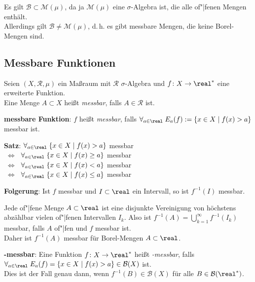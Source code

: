 Es gilt $\mathcal{B} \subset \mathcal{M}(\mu)$, da ja $\mathcal{M}(\mu)$ eine
$\sigma$-Algebra ist, die alle of"|fenen Mengen enthält. \\
Allerdings gilt $\mathcal{B} \not= \mathcal{M}(\mu)$, d.\,h. es gibt
messbare Mengen, die keine Borel-Mengen sind.

\pagebreak

\subsection{%
    Messbare Funktionen%
}

Seien $(X, \mathcal{R}, \mu)$ ein Maßraum mit $\mathcal{R}$ $\sigma$-Algebra
und $f\colon X \rightarrow \real^\ast$ eine erweiterte Funktion. \\
Eine Menge $A \subset X$ heißt \emph{messbar}, falls $A \in \mathcal{R}$ ist.

\textbf{messbare Funktion}:
$f$ heißt \emph{messbar}, falls
$\forall_{a \in \real}\; E_a(f) := \{x \in X \;|\; f(x) > a\}$ messbar ist.

\textbf{Satz}:
$\forall_{a \in \real}\; \{x \in X \;|\; f(x) > a\}$ messbar \\
$\;\Leftrightarrow\;$
$\forall_{a \in \real}\; \{x \in X \;|\; f(x) \ge a\}$ messbar \\
$\;\Leftrightarrow\;$
$\forall_{a \in \real}\; \{x \in X \;|\; f(x) < a\}$ messbar \\
$\;\Leftrightarrow\;$
$\forall_{a \in \real}\; \{x \in X \;|\; f(x) \le a\}$ messbar

\textbf{Folgerung}:
Ist $f$ messbar und $I \subset \real$ ein Intervall,
so ist $f^{-1}(I)$ messbar.

Jede of"|fene Menge $A \subset \real$ ist eine disjunkte Vereinigung von
höchstens abzählbar vielen of"|fenen Intervallen $I_k$.
Also ist $f^{-1}(A) = \bigcup_{k=1}^\infty f^{-1}(I_k)$
messbar, falls $A$ of"|fen und $f$ messbar ist. \\
Daher ist $f^{-1}(A)$ messbar für Borel-Mengen $A \subset \real$.

\textbf{-messbar}:
Eine Funktion $f\colon X \rightarrow \real^\ast$ heißt
\emph{-messbar}, falls \\
$\forall_{a \in \real}\; E_a(f) = \{x \in X \;|\; f(x) > a\}
\in \mathcal{B}(X)$ ist. \\
Dies ist der Fall genau dann, wenn $f^{-1}(B) \in \mathcal{B}(X)$ für alle
$B \in \mathcal{B}(\real^\ast)$.

\linie

